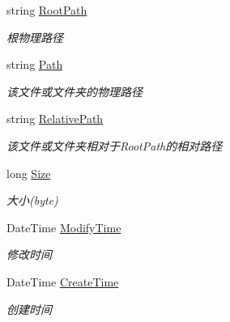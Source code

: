 \begin{DoxyCompactItemize}
string \hyperlink{class_x_c_l_net_tools_1_1_entity_1_1_file_info_entity_a6ef4c659747c605379a43168ae1d64f6}{Root\-Path}
\begin{DoxyCompactList}\small\item\em 根物理路径 \end{DoxyCompactList}\item 
string \hyperlink{class_x_c_l_net_tools_1_1_entity_1_1_file_info_entity_a67f485c1a1af6205351305756d515e98}{Path}
\begin{DoxyCompactList}\small\item\em 该文件或文件夹的物理路径 \end{DoxyCompactList}\item 
string \hyperlink{class_x_c_l_net_tools_1_1_entity_1_1_file_info_entity_a795982d186fa2d1ef0e3fb51705f36b2}{Relative\-Path}
\begin{DoxyCompactList}\small\item\em 该文件或文件夹相对于\-Root\-Path的相对路径 \end{DoxyCompactList}\item 
long \hyperlink{class_x_c_l_net_tools_1_1_entity_1_1_file_info_entity_a7447a43994e75793388e160a626ba346}{Size}
\begin{DoxyCompactList}\small\item\em 大小(byte) \end{DoxyCompactList}\item 
Date\-Time \hyperlink{class_x_c_l_net_tools_1_1_entity_1_1_file_info_entity_a64c6633bec7e4d547632c122dbaad9f8}{Modify\-Time}
\begin{DoxyCompactList}\small\item\em 修改时间 \end{DoxyCompactList}\item 
Date\-Time \hyperlink{class_x_c_l_net_tools_1_1_entity_1_1_file_info_entity_a93fc7b2a3119885d9449d1817e7306ca}{Create\-Time}
\begin{DoxyCompactList}\small\item\em 创建时间 \end{DoxyCompactList}\end{DoxyCompactItemize}


